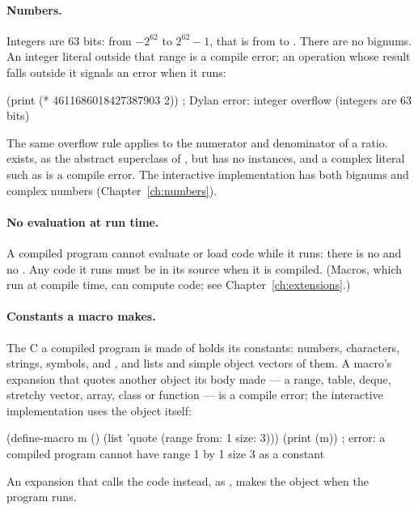 \paragraph{Numbers.}
Integers are 63 bits: from $-2^{62}$ to $2^{62}-1$, that is from
 to . There are no
bignums. An integer literal outside that range is a compile error; an
operation whose result falls outside it signals an error when it runs:

\begin{dylan}
(print (* 4611686018427387903 2))
; Dylan error: integer overflow (integers are 63 bits)
\end{dylan}

The same overflow rule applies to the numerator and denominator of a
ratio.  exists, as the abstract superclass of
, but has no instances, and a complex literal such as
 is a compile error. The interactive implementation has
both bignums and complex numbers (Chapter~\ref{ch:numbers}).

\paragraph{No evaluation at run time.}
A compiled program cannot evaluate or load code while it runs: there is
no  and no . Any code it runs must be in its
source when it is compiled. (Macros, which run at compile time, can
compute code; see Chapter~\ref{ch:extensions}.)

\paragraph{Constants a macro makes.}
The C a compiled program is made of holds its constants: numbers,
characters, strings, symbols,  and , and lists and
simple object vectors of them. A macro's expansion that quotes another
object its body made --- a range, table, deque, stretchy vector, array,
class or function --- is a compile error; the interactive implementation
uses the object itself:

\begin{dylan}
(define-macro m () (list 'quote (range from: 1 size: 3)))
(print (m))
; error: a compiled program cannot have {range 1 by 1 size 3} as a constant
\end{dylan}

\noindent An expansion that calls the code instead, as
, makes the object when the program runs.

